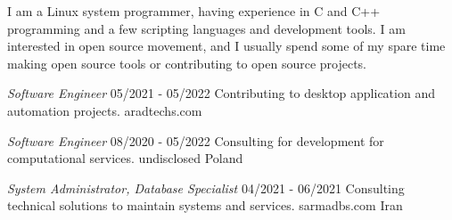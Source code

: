 \documentclass[a4paper,12pt]{memoir} %
\begin{document}
\userinformation %

\framebreak %


\CVDate




{I am a Linux system programmer, having experience in C and C++ programming and a few scripting languages and development tools. I am interested in open source movement, and I usually spend some of my spare time making open source tools or contributing to open source projects.}


\SmallSep %




{\textit{Software Engineer}}
{05/2021 - 05/2022}
{Contributing to desktop application and automation projects.}
{aradtechs.com}


{\textit{Software Engineer}}
{08/2020 - 05/2022}
{Consulting for development for computational services.}
{undisclosed}
{Poland}


{\textit{System Administrator, Database Specialist}}
{04/2021 - 06/2021}
{Consulting technical solutions to maintain systems and services.}
{sarmadbs.com}
{Iran}
\end{document}
